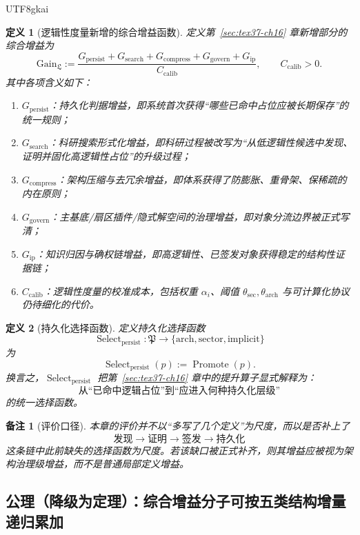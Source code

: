 \documentclass[12pt]{article}
\newtheorem{definition}{定义}[section]
\newtheorem{remark}{备注}[section]
\newcommand{\Select}{\operatorname{Select}}
\newcommand{\Promote}{\operatorname{Promote}}
\begin{document}
\begin{CJK*}{UTF8}{gkai}
\begin{definition}[逻辑性度量新增的综合增益函数]
\label{def:tex37-ch17-gain}
定义第~\ref{sec:tex37-ch16} 章新增部分的综合增益为
\[
  \mathrm{Gain}_{\mathfrak L}
  :=
  \frac{
    G_{\mathrm{persist}}
    +
    G_{\mathrm{search}}
    +
    G_{\mathrm{compress}}
    +
    G_{\mathrm{govern}}
    +
    G_{\mathrm{ip}}
  }{
    C_{\mathrm{calib}}
  },
  \qquad
  C_{\mathrm{calib}}>0.
\]
其中各项含义如下：
\begin{enumerate}
  \item $G_{\mathrm{persist}}$：持久化判据增益，即系统首次获得“哪些已命中占位应被长期保存”的统一规则；
  \item $G_{\mathrm{search}}$：科研搜索形式化增益，即科研过程被改写为“从低逻辑性候选中发现、证明并固化高逻辑性占位”的升级过程；
  \item $G_{\mathrm{compress}}$：架构压缩与去冗余增益，即体系获得了防膨胀、重骨架、保稀疏的内在原则；
  \item $G_{\mathrm{govern}}$：主基底/扇区插件/隐式解空间的治理增益，即对象分流边界被正式写清；
  \item $G_{\mathrm{ip}}$：知识归因与确权链增益，即高逻辑性、已签发对象获得稳定的结构性证据链；
  \item $C_{\mathrm{calib}}$：逻辑性度量的校准成本，包括权重 $\alpha_i$、阈值 $\theta_{\mathrm{sec}},\theta_{\mathrm{arch}}$ 与可计算化协议仍待细化的代价。

\end{enumerate}
\end{definition}

\begin{definition}[持久化选择函数]
\label{def:tex37-ch17-select}
定义持久化选择函数
\[
  \Select_{\mathrm{persist}}:\mathfrak P\to\{\mathrm{arch},\mathrm{sector},\mathrm{implicit}\}
\]
为
\[
  \Select_{\mathrm{persist}}(p):=\Promote(p).
\]
换言之，$\Select_{\mathrm{persist}}$ 把第~\ref{sec:tex37-ch16} 章中的提升算子显式解释为：
\[
  \text{从“已命中逻辑占位”到“应进入何种持久化层级”}
\]
的统一选择函数。
\end{definition}

\begin{remark}[评价口径]
本章的评价并不以“多写了几个定义”为尺度，而以是否补上了
\[
  \text{发现}
  \to
  \text{证明}
  \to
  \text{签发}
  \to
  \text{持久化}
\]
这条链中此前缺失的选择函数为尺度。若该缺口被正式补齐，则其增益应被视为架构治理级增益，而不是普通局部定义增益。
\end{remark}

\subsection{公理（降级为定理）：综合增益分子可按五类结构增量递归累加}
\label{subsec:tex37-ch17-axiom}


\end{CJK*}
\end{document}
